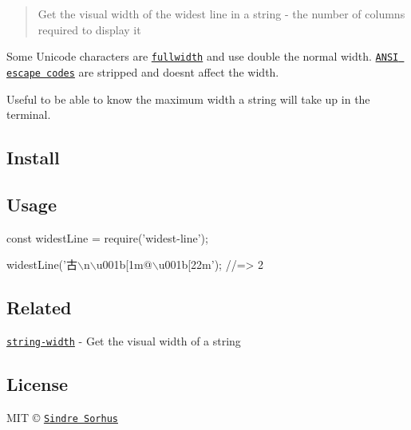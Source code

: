 \begin{quote}
Get the visual width of the widest line in a string -\/ the number of columns required to display it \end{quote}


Some Unicode characters are \href{https://en.wikipedia.org/wiki/Halfwidth_and_fullwidth_forms}{\tt fullwidth} and use double the normal width. \href{http://en.wikipedia.org/wiki/ANSI_escape_code}{\tt A\+N\+SI escape codes} are stripped and doesn\textquotesingle{}t affect the width.

Useful to be able to know the maximum width a string will take up in the terminal.

\subsection*{Install}




\subsection*{Usage}


\begin{DoxyCode}
const widestLine = require('widest-line');

widestLine('古\(\backslash\)n\(\backslash\)u001b[1m@\(\backslash\)u001b[22m');
//=> 2
\end{DoxyCode}


\subsection*{Related}


\begin{DoxyItemize}
\item \href{https://github.com/sindresorhus/string-width}{\tt string-\/width} -\/ Get the visual width of a string
\end{DoxyItemize}

\subsection*{License}

M\+IT © \href{http://sindresorhus.com}{\tt Sindre Sorhus} 